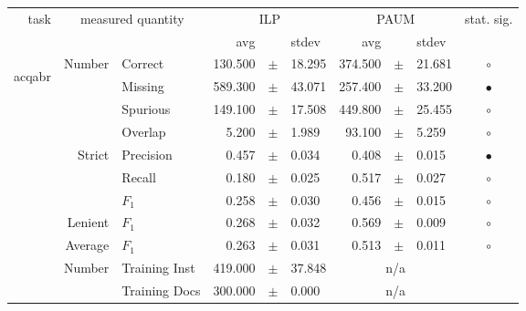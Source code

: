 \begin{longtable}{|r|r|l||rcl|rcl|c|}
\hline
\multirow{2}{*}{task} & \multicolumn{2}{|c||}{\multirow{2}{*}{measured quantity}} & \multicolumn{3}{|c|}{ILP} & \multicolumn{3}{|c|}{PAUM} & \multirow{2}{*}{ stat. sig.}\\
\cline{4-9}
  & \multicolumn{2}{|c||}{} &  avg  &    &  stdev  &  avg  &    &  stdev  & \\
\hline
\endhead
\hline
\hline
\multirow{11}{*}{\begin{sideways}acqabr\end{sideways} }
             & \multirow{4}{*}{    Number} &         Correct &     130.500 &  $\pm$  &      18.295 &     374.500 &  $\pm$  &      21.681 & $\circ$ \\
\cline{3-10} &                             &         Missing &     589.300 &  $\pm$  &      43.071 &     257.400 &  $\pm$  &      33.200 & $\bullet$ \\
\cline{3-10} &                             &        Spurious &     149.100 &  $\pm$  &      17.508 &     449.800 &  $\pm$  &      25.455 & $\circ$ \\
\cline{3-10} &                             &         Overlap &       5.200 &  $\pm$  &       1.989 &      93.100 &  $\pm$  &       5.259 & $\circ$ \\
\cline{2-10} & \multirow{3}{*}{    Strict} &       Precision &       0.457 &  $\pm$  &       0.034 &       0.408 &  $\pm$  &       0.015 & $\bullet$ \\
\cline{3-10} &                             &          Recall &       0.180 &  $\pm$  &       0.025 &       0.517 &  $\pm$  &       0.027 & $\circ$ \\
\cline{3-10} &                             &           $F_1$ &       0.258 &  $\pm$  &       0.030 &       0.456 &  $\pm$  &       0.015 & $\circ$ \\
\cline{2-10} &                     Lenient &           $F_1$ &       0.268 &  $\pm$  &       0.032 &       0.569 &  $\pm$  &       0.009 & $\circ$ \\
\cline{2-10} &                     Average &           $F_1$ &       0.263 &  $\pm$  &       0.031 &       0.513 &  $\pm$  &       0.011 & $\circ$ \\
\cline{2-10} & \multirow{2}{*}{    Number} &   Training Inst &     419.000 &  $\pm$  &      37.848 &    \multicolumn{3}{c|}{n/a}         &  \\
\cline{3-10} &                             &   Training Docs &     300.000 &  $\pm$  &       0.000 &    \multicolumn{3}{c|}{n/a}         &  \\

\end{longtable}
